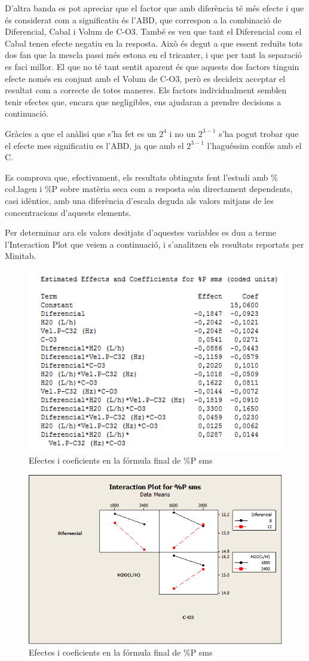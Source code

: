 \documentclass[a4paper]{article}
\begin{document}
D’altra banda es pot apreciar que el factor que amb diferència té més efecte i que és considerat com a significatiu és l’ABD, que correspon a la combinació de Diferencial, Cabal i Volum de C-O3. També es veu que tant el Diferencial com el Cabal tenen efecte negatiu en la resposta. Això és degut a que essent reduïts tots dos fan que la mescla passi més estona en el tricanter, i que per tant la separació es faci millor. El que no té tant sentit aparent és que aquests dos factors tinguin efecte només en conjunt amb el Volum de C-O3, però es decideix acceptar el resultat com a correcte de totes maneres. Els factors individualment semblen tenir efectes que, encara que negligibles, ens ajudaran a prendre decisions a continuació.

Gràcies a que el anàlisi que s'ha fet es un $2^4$ i no un $2^{3-1}$ s'ha pogut trobar que el efecte mes significatiu es l'ABD, ja que amb el $2^{3-1}$ l'haguéssim confós amb el C. 

Es comprova que, efectivament, els resultats obtinguts fent l’estudi amb \% co\l.lagen i \%P sobre matèria seca com a resposta són directament dependents, casi idèntics, amb una diferència d’escala deguda als valors mitjans de les concentracions d’aquests elements.
 
Per determinar ara els valors desitjats d’aquestes variables es duu a terme l’Interaction Plot que veiem a continuació, i s’analitzen els resultats reportats per Minitab.

\begin{figure}[H]
	\centering
	\includegraphics[width=.5\textwidth]{images/Coefs}
	\caption{Efectes i coeficients en la fórmula final de \%P sms}
	\label{fig:Coefs}
\end{figure} 	

\begin{figure}[H]
	\centering
	\includegraphics[width=.5\textwidth]{images/InteractionP}
	\caption{Efectes i coeficients en la fórmula final de \%P sms}
	\label{fig:InteractionP}
\end{figure} 
\end{document}

